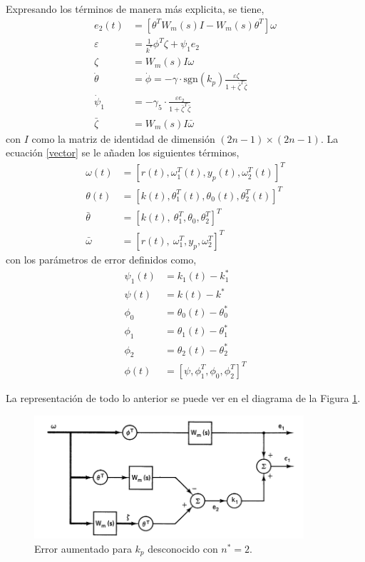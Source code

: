 \documentclass[letterpaper,11pt]{article} %
\begin{document}
Expresando los términos de manera más explicita, se tiene,
\begin{align}
	e_2(t) &= [\theta^T W_m(s) I - W_m (s)\theta^T]\omega \nonumber \\
	\varepsilon &= \frac{1}{k^*} \phi^T \zeta + \psi_1 e_2  \nonumber \\
	\zeta &= W_m(s)I \omega \nonumber \\
	\dot{\theta} &= \dot{\phi} =  -\gamma \cdot\mathrm{sgn}(k_p) \frac{\varepsilon \zeta}{1 + \bar{\zeta}^T \bar{\zeta}}\nonumber \\
	\dot{\psi}_1 &= -\gamma_5\cdot\frac{\varepsilon e_2}{1 + \bar{\zeta}^T \bar{\zeta}}\nonumber \\
	\bar{\zeta} &= W_m(s)I \bar{\omega}
\end{align}
con $I$ como la matriz de identidad de dimensión  $ (2n-1)\times(2n - 1)$. La ecuación \eqref{vector} se le añaden los siguientes términos,
\begin{align}
	\omega(t) &= [r(t), \omega_1^T(t), y_p(t), \omega_2^T(t)]^T \nonumber \\
	\theta(t) &= [k(t), \theta_1^T(t), \theta_0(t), \theta_2^T(t)]^T \nonumber \\
	\bar{\theta} &= [k(t),\ \theta_1^T, \theta_0, \theta_2^T]^T\nonumber\\
	\bar{\omega} &= [r(t),\ \omega_1^T, y_p, \omega_2^T]^T  
\end{align}
con los parámetros de error definidos como,
\begin{align}
		\psi_1(t) &= k_1(t) - k_1^* \nonumber \\
		\psi(t) &= k(t) - k^* \nonumber \\
		\phi_0 &= \theta_0(t) - \theta_0^* \nonumber \\
		\phi_1 &= \theta_1(t) - \theta_1^* \nonumber \\
		\phi_2 &= \theta_2(t) - \theta_2^* \nonumber \\
		\phi(t) &= [\psi, \phi_1^T, \phi_0, \phi_2^T]^T 
\end{align}

La representación de todo lo anterior se puede ver en el diagrama de la Figura \ref{errordiagrama}.

\begin{figure}[h]
	\centering
	\includegraphics[width=10cm]{error.png}
	\caption{Error aumentado para $k_p$ desconocido con $n^* =2$.}
	\label{errordiagrama}
\end{figure}
\end{document}
